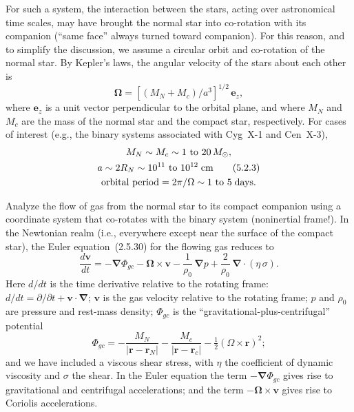 For such a system, the interaction between the stars, acting over astronomical
time scales, may have brought the normal star into co-rotation with its
companion (``same face'' always turned toward companion).  For this reason,
and to simplify the discussion, we assume a circular orbit and co-rotation
of the normal star.  By Kepler's laws, the angular velocity of the stars
about each other is
\begin{equation}
\boldsymbol{\Omega} = \left[(M_N + M_c)/a^3\right]^{1/2}\,\mathbf{e}_z,
\tag{5.2.2}
\end{equation}
where $\mathbf{e}_z$ is a unit vector perpendicular to the orbital plane, and
where $M_N$ and $M_c$ are the mass of the normal star and the compact star,
respectively.  For cases of interest (e.g., the binary systems associated
with Cyg~X-1 and Cen~X-3),
\begin{gather}
M_N \sim M_c \sim 1 \text{ to } 20\,M_\odot, \notag\\
a \sim 2R_N \sim 10^{11} \text{ to } 10^{12}\;\text{cm} \tag{5.2.3}\\
\text{orbital period} = 2\pi/\Omega \sim 1 \text{ to } 5\;\text{days.}
\notag
\end{gather}

Analyze the flow of gas from the normal star to its compact companion using
a coordinate system that co-rotates with the binary system (noninertial
frame!).  In the Newtonian realm (i.e., everywhere except near the surface
of the compact star), the Euler equation~(2.5.30) for the flowing gas
reduces to
\begin{equation}
\frac{d\mathbf{v}}{dt}
  = -\boldsymbol{\nabla}\Phi_{gc}
    - \boldsymbol{\Omega}\times\mathbf{v}
    - \frac{1}{\rho_0}\,\boldsymbol{\nabla}p
    + \frac{2}{\rho_0}\,\boldsymbol{\nabla}\cdot(\eta\,\sigma).
\tag{5.2.4}
\end{equation}
Here $d/dt$ is the time derivative relative to the rotating frame:
$d/dt = \partial/\partial t + \mathbf{v}\cdot\boldsymbol{\nabla}$;
$\mathbf{v}$ is the gas velocity relative to the rotating frame; $p$ and
$\rho_0$ are pressure and rest-mass density; $\Phi_{gc}$ is the
``gravitational-plus-centrifugal'' potential
\begin{equation}
\Phi_{gc} = -\frac{M_N}{|\mathbf{r}-\mathbf{r}_N|}
            -\frac{M_c}{|\mathbf{r}-\mathbf{r}_c|}
            -\tfrac{1}{2}(\Omega\times\mathbf{r})^2;
\tag{5.2.5}
\end{equation}
and we have included a viscous shear stress, with $\eta$ the coefficient of
dynamic viscosity and $\sigma$ the shear.  In the Euler equation the term
$-\boldsymbol{\nabla}\Phi_{gc}$ gives rise to gravitational and centrifugal
accelerations; and the term $-\boldsymbol{\Omega}\times\mathbf{v}$ gives
rise to Coriolis accelerations.

